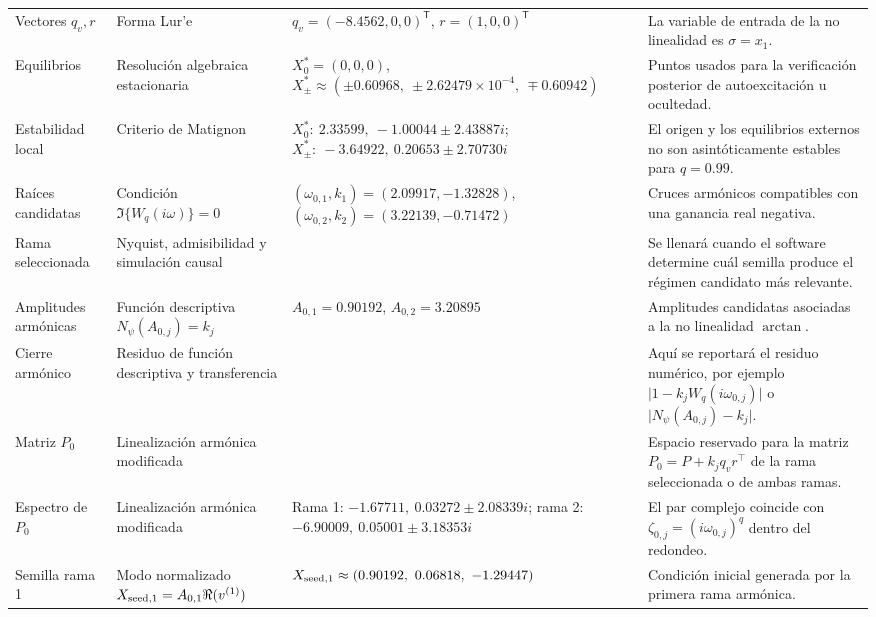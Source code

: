 \documentclass[journal]{IEEEtran}
\begin{document}
\begin{table}[htbp]
\begin{adjustbox}{max width=\textwidth}
\begin{tabular}{@{}L{2.7cm}L{3.4cm}L{4.4cm}L{5.8cm}@{}}
Vectores \(q_v,r\) &
Forma Lur'e &
\(q_v=(-8.4562,0,0)^\mathsf{T}\), \(r=(1,0,0)^\mathsf{T}\) &
La variable de entrada de la no linealidad es \(\sigma=x_1\). \\

Equilibrios &
Resolución algebraica estacionaria &
\(X_0^*=(0,0,0)\), \(X_\pm^*\approx(\pm0.60968,\ \pm2.62479\times10^{-4},\ \mp0.60942)\) &
Puntos usados para la verificación posterior de autoexcitación u ocultedad. \\

Estabilidad local &
Criterio de Matignon &
\(X_0^*:\ 2.33599,\ -1.00044\pm2.43887i\); \(X_\pm^*:\ -3.64922,\ 0.20653\pm2.70730i\) &
El origen y los equilibrios externos no son asintóticamente estables para \(q=0.99\). \\

Raíces candidatas &
Condición \(\Im\{W_q(i\omega)\}=0\) &
\((\omega_{0,1},k_1)=(2.09917,-1.32828)\), \((\omega_{0,2},k_2)=(3.22139,-0.71472)\) &
Cruces armónicos compatibles con una ganancia real negativa. \\

Rama seleccionada &
Nyquist, admisibilidad y simulación causal &
 &
Se llenará cuando el software determine cuál semilla produce el régimen candidato más relevante. \\

Amplitudes armónicas &
Función descriptiva \(N_\psi(A_{0,j})=k_j\) &
\(A_{0,1}=0.90192\), \(A_{0,2}=3.20895\) &
Amplitudes candidatas asociadas a la no linealidad \(\arctan\). \\

Cierre armónico &
Residuo de función descriptiva y transferencia &
 &
Aquí se reportará el residuo numérico, por ejemplo \(\lvert1-k_jW_q(i\omega_{0,j})\rvert\) o \(\lvert N_\psi(A_{0,j})-k_j\rvert\). \\

Matriz \(P_0\) &
Linealización armónica modificada &
 &
Espacio reservado para la matriz \(P_0=P+k_jq_vr^\top\) de la rama seleccionada o de ambas ramas. \\

Espectro de \(P_0\) &
Linealización armónica modificada &
Rama 1: \(-1.67711,\ 0.03272\pm2.08339i\); rama 2: \(-6.90009,\ 0.05001\pm3.18353i\) &
El par complejo coincide con \(\zeta_{0,j}=(i\omega_{0,j})^q\) dentro del redondeo. \\

Semilla rama 1 &
Modo normalizado \(X_{{\rm seed},1}=A_{0,1}\Re(v^{(1)})\) &
\(X_{{\rm seed},1}\approx(0.90192,\ 0.06818,\ -1.29447)\) &
Condición inicial generada por la primera rama armónica. \\


\end{tabular}
\end{adjustbox}
\end{table}
\end{document}
